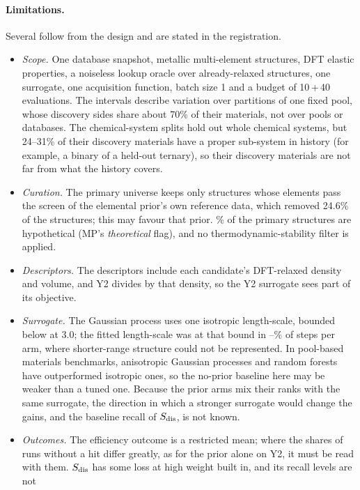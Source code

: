 \paragraph{Limitations.} Several follow from the design and are stated in the registration.
\begin{itemize}\setlength{\itemsep}{1pt}
\item \emph{Scope.} One database snapshot, metallic multi-element structures, DFT elastic properties, a noiseless lookup oracle
over already-relaxed structures, one surrogate, one acquisition function, batch size 1 and a budget of 10\,+\,40 evaluations. The
intervals describe variation over partitions of one fixed pool, whose discovery sides share about 70\% of their materials, not
over pools or databases. The chemical-system splits hold out whole chemical systems, but 24--31\% of their discovery materials
have a proper sub-system in history (for example, a binary of a held-out ternary), so their discovery materials are not far from
what the history covers.
\item \emph{Curation.} The primary universe keeps only structures whose elements pass the screen of the elemental prior's own
reference data, which removed 24.6\% of the structures; this may favour that prior. \% of the primary structures are hypothetical
(MP's \emph{theoretical} flag), and no thermodynamic-stability filter is applied.
\item \emph{Descriptors.} The descriptors include each candidate's DFT-relaxed density and volume, and Y2 divides by that density,
so the Y2 surrogate sees part of its objective.
\item \emph{Surrogate.} The Gaussian process uses one isotropic length-scale, bounded below at 3.0; the fitted length-scale was
at that bound in --\% of steps per arm, where shorter-range structure
could not be represented. In pool-based materials benchmarks, anisotropic
Gaussian processes and random forests have outperformed isotropic ones\cite{liang2021benchmarking}, so the no-prior baseline here
may be weaker than a tuned one. Because the prior arms mix their ranks with the same surrogate, the direction in which a
stronger surrogate would change the gains, and the baseline recall of $S_{\mathrm{dis}}$, is not known.
\item \emph{Outcomes.} The efficiency outcome is a restricted mean; where the shares of runs without a hit differ greatly, as for
the prior alone on Y2, it must be read with them. $S_{\mathrm{dis}}$ has some loss at high weight built in, and its recall levels are not

\end{itemize}

